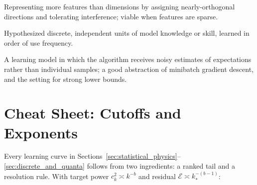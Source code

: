 \documentclass[11pt,a4paper]{article}
\theoremstyle{definition}
\begin{document}
\begin{description}[leftmargin=0pt,style=nextline]
  \item[Superposition] Representing more features than dimensions by assigning nearly-orthogonal directions and tolerating interference; viable when features are sparse.
  \item[Quanta] Hypothesized discrete, independent units of model knowledge or skill, learned in order of use frequency.
  \item[Statistical query (SQ) model] A learning model in which the algorithm receives noisy estimates of expectations rather than individual samples; a good abstraction of minibatch gradient descent, and the setting for strong lower bounds.
\end{description}

\section{Cheat Sheet: Cutoffs and Exponents}
\label{app:cheatsheet}

Every learning curve in Sections~\ref{sec:statistical_physics}--\ref{sec:discrete_and_quanta} follows from two ingredients: a ranked tail and a resolution rule. With target power $c_k^2\asymp k^{-b}$ and residual $\mathcal{E}\asymp k_*^{-(b-1)}$:
\end{document}
